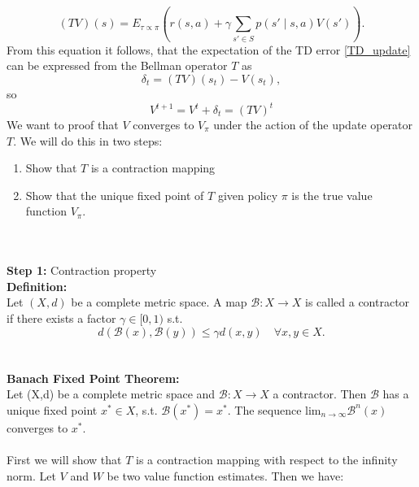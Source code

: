 \begin{equation}
    (T V)(s) = E_{\tau \propto \pi} \left(r(s,a) + \gamma \sum_{s' \in S} p(s' \mid s,a) V(s')\right).
\end{equation}
From this equation it follows, that the expectation of the TD error \ref{TD_update} can be expressed from the Bellman operator $T$ as 
\begin{equation}
    \label{TD_update_BM}
    \delta_t = (T V)(s_t) - V(s_t),
\end{equation} 
so 
\begin{equation*}
    V^{t+1} = V^t + \delta_t = (T V)^t
\end{equation*}
We want to proof that $V$ converges to $V_{\pi}$ under the action of the update operator $T$. We will do this in two steps:
\begin{enumerate}
    \item Show that $T$ is a contraction mapping
    \item Show that the unique fixed point of $T$ given policy $\pi$ is the true value function $V_{\pi}$.
\end{enumerate}
\\ \\

\textbf{Step 1:} Contraction property\\
\textbf{Definition:}\\
Let $(X, d)$ be a complete metric space. A map $\mathcal{B}:X \rightarrow X$ is called a contractor if there exists a factor $\gamma \in [0, 1)$ s.t.
\begin{equation}
    d(\mathcal{B}(x), \mathcal{B}(y)) \leq \gamma d(x,y) \quad \forall x,y \in X.
\end{equation}
\\ \\

\textbf{Banach Fixed Point Theorem:}\\
Let (X,d) be a complete metric space and $\mathcal{B}:X \rightarrow X$ a contractor. 
Then $\mathcal{B}$ has a unique fixed point $x^* \in X$, s.t. $\mathcal{B}(x^*) = x^*$. The sequence $\text{lim}_{n \rightarrow \infty}\mathcal{B}^n(x)$ converges to $x^*$.\\ \\

First we will show that $T$ is a contraction mapping with respect to the infinity norm. Let $V$ and $W$ be two value function estimates. Then we have:

